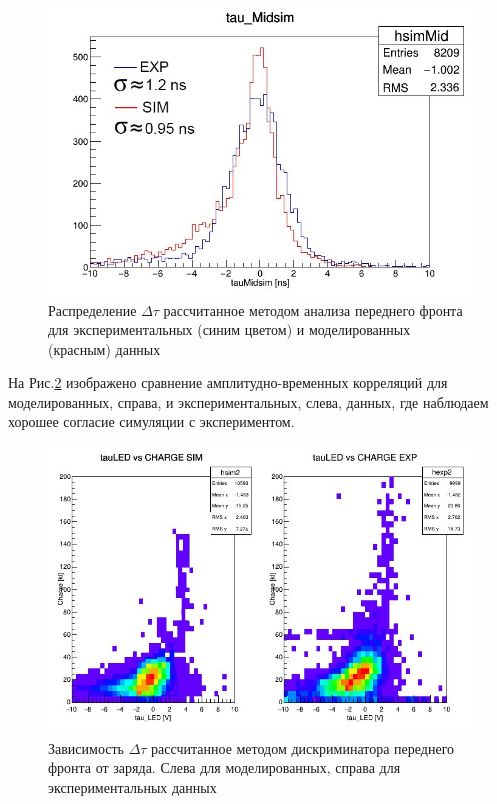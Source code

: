 \begin{figure}[!ht]
	\centering
	\includegraphics[width=0.8\linewidth]{tausim.png}
	\caption{Распределение $\Delta\tau$ рассчитанное методом анализа переднего фронта для экспериментальных (синим цветом) и моделированных (красным) данных}\label{ris:tausim}
\end{figure}
	
На Рис.\ref{ris:ampsim} изображено сравнение амплитудно-временных корреляций для моделированных, справа, и экспериментальных, слева, данных, где наблюдаем хорошее согласие симуляции с экспериментом. 

\begin{figure}
	\centering
	\includegraphics[width=\linewidth]{ampsim.png}
	\caption{Зависимость $\Delta\tau$ рассчитанное методом дискриминатора переднего фронта от заряда. Слева для моделированных, справа для экспериментальных данных }\label{ris:ampsim}
\end{figure}

